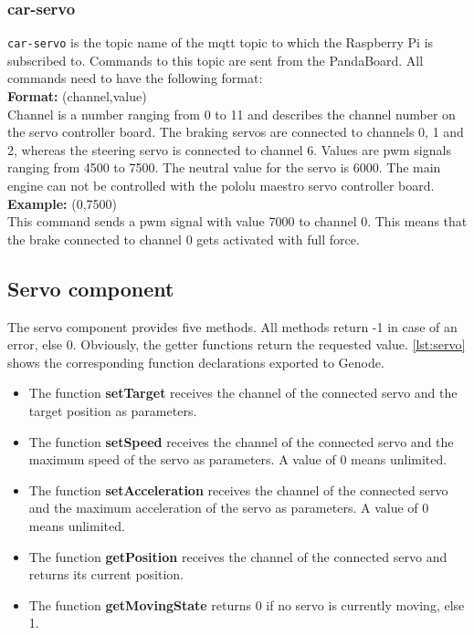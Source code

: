 \subsubsection{car-servo}
\label{sec:mqtt-car-servo}
\texttt{car-servo} is the topic name of the mqtt topic to which the Raspberry Pi is subscribed to. Commands to this topic are sent from the PandaBoard. All commands need to have the following format: \\ 

\textbf{Format:} (channel,value) \\
Channel is a number ranging from 0 to 11 and describes the channel number on the servo controller board. The braking servos are connected to channels 0, 1 and 2, whereas the steering servo is connected to channel 6. Values are pwm signals ranging from 4500 to 7500. The neutral value for the servo is 6000. The main engine can not be controlled with the pololu maestro servo controller board. \\

\textbf{Example:} (0,7500) \\
This command sends a pwm signal with value 7000 to channel 0. This means that the brake connected to channel 0 gets activated with full force. 




\subsection{Servo component}
\label{sec:comp-servo}

The servo component provides five methods. All methods return -1 in case of an error, else 0. Obviously, the getter functions return the requested value.
\autoref{lst:servo} shows the corresponding function declarations exported to Genode.
\begin{itemize}
\item The function \textbf{setTarget} receives the channel of the connected servo and the target position as parameters.
\item The function \textbf{setSpeed} receives the channel of the connected servo and the maximum speed of the servo as parameters. A value of 0 means unlimited.
\item The function \textbf{setAcceleration} receives the channel of the connected servo and the maximum acceleration of the servo as parameters. A value of 0 means unlimited.
\item The function \textbf{getPosition} receives the channel of the connected servo and returns its current position.
\item The function \textbf{getMovingState} returns 0 if no servo is currently moving, else 1.
\end{itemize}

